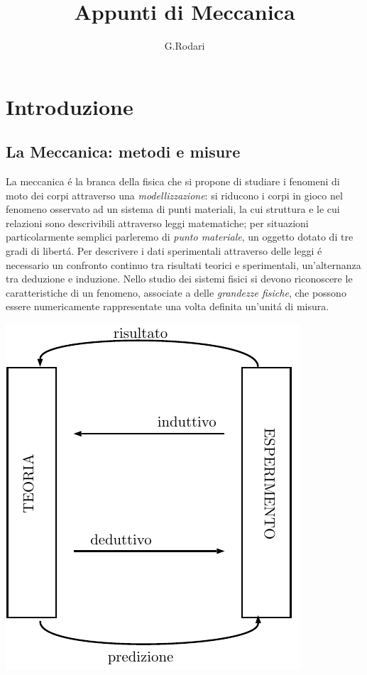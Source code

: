 \documentclass[14pt]{report}
\title{Appunti di Meccanica}
\author{G.Rodari}
\begin{document}
\maketitle
\tableofcontents

\chapter[Introduzione 7-3-2017]{Introduzione}

\section{La Meccanica: metodi e misure}

La meccanica é la branca della fisica che si propone di studiare i fenomeni di moto dei corpi attraverso una \emph{modellizzazione}: si riducono i corpi in gioco nel fenomeno osservato ad un sistema di punti materiali, la cui struttura e le cui relazioni sono descrivibili attraverso leggi matematiche; per situazioni particolarmente semplici parleremo di \emph{punto materiale}, un oggetto dotato di tre gradi di libertá.
Per descrivere i dati sperimentali attraverso delle leggi é necessario un confronto continuo tra risultati teorici e sperimentali, un'alternanza tra deduzione e induzione. Nello studio dei sistemi fisici si devono riconoscere le caratteristiche di un fenomeno, associate a delle \emph{grandezze fisiche}, che possono essere numericamente rappresentate una volta definita un'unitá di misura.\\ \begin{center}\includegraphics[scale=0.8]{tabella_metodo.pdf}\end{center}
\end{document}
